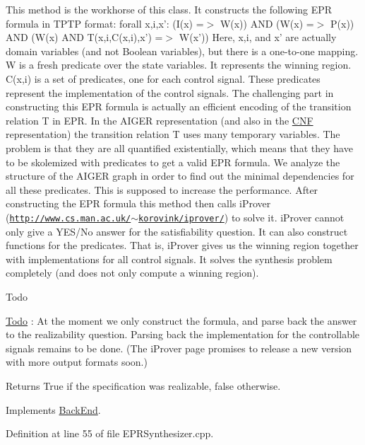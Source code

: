 This method is the workhorse of this class. It constructs the following E\-P\-R formula in T\-P\-T\-P format\-: forall x,i,x'\-: (I(x) =$>$ W(x)) A\-N\-D (W(x) =$>$ P(x)) A\-N\-D (W(x) A\-N\-D T(x,i,C(x,i),x') =$>$ W(x')) Here, x,i, and x' are actually domain variables (and not Boolean variables), but there is a one-\/to-\/one mapping. W is a fresh predicate over the state variables. It represents the winning region. C(x,i) is a set of predicates, one for each control signal. These predicates represent the implementation of the control signals. The challenging part in constructing this E\-P\-R formula is actually an efficient encoding of the transition relation T in E\-P\-R. In the A\-I\-G\-E\-R representation (and also in the \hyperlink{classCNF}{C\-N\-F} representation) the transition relation T uses many temporary variables. The problem is that they are all quantified existentially, which means that they have to be skolemized with predicates to get a valid E\-P\-R formula. We analyze the structure of the A\-I\-G\-E\-R graph in order to find out the minimal dependencies for all these predicates. This is supposed to increase the performance. After constructing the E\-P\-R formula this method then calls i\-Prover (\href{http://www.cs.man.ac.uk/~korovink/iprover/}{\tt http\-://www.\-cs.\-man.\-ac.\-uk/$\sim$korovink/iprover/}) to solve it. i\-Prover cannot only give a Y\-E\-S/\-No answer for the satisfiability question. It can also construct functions for the predicates. That is, i\-Prover gives us the winning region together with implementations for all control signals. It solves the synthesis problem completely (and does not only compute a winning region).

\begin{DoxyRefDesc}{Todo}
\item[\hyperlink{todo__todo000002}{Todo}]\-: At the moment we only construct the formula, and parse back the answer to the realizability question. Parsing back the implementation for the controllable signals remains to be done. (The i\-Prover page promises to release a new version with more output formats soon.) \end{DoxyRefDesc}
\begin{DoxyReturn}{Returns}
True if the specification was realizable, false otherwise. 
\end{DoxyReturn}


Implements \hyperlink{classBackEnd_a099e717dc71e9cc2d838b1ca86340590}{Back\-End}.



Definition at line 55 of file E\-P\-R\-Synthesizer.\-cpp.



